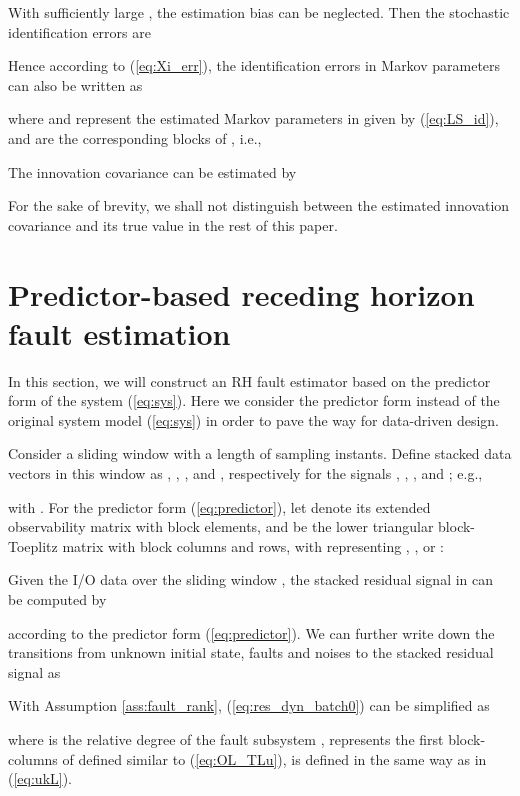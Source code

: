 \documentclass[twocolumn]{autart}
\begin{document}
With sufficiently large , the estimation bias
 can be neglected. Then the stochastic identification errors are

Hence according to (\ref{eq:Xi_err}), the identification errors in Markov parameters can also be written as

where  and  represent the estimated Markov parameters in  given by (\ref{eq:LS_id}),  and  are the corresponding blocks of , i.e.,



The innovation covariance can be estimated by \cite{Gust2001, Kata2005}

For the sake of brevity, we shall not distinguish between the estimated innovation covariance  and its true value  in the rest of this paper.

\section{Predictor-based receding horizon fault estimation}\label{sect:RHFE_predictor}
In this section, we will construct an RH fault estimator based on the predictor form of the system (\ref{eq:sys}). Here we consider the predictor form instead of the original system model (\ref{eq:sys}) in order to pave the way for data-driven design. 



Consider a sliding window with a length of  sampling instants. Define stacked data vectors in this window as , , , and , respectively for the signals , , , and ; e.g.,

with . For the predictor form  (\ref{eq:predictor}), let  denote its extended observability matrix with  block elements, and  be the lower triangular block-Toeplitz matrix with  block columns and rows, with  representing , , or :



Given the I/O data over the sliding window ,
the stacked residual signal  in  can be computed by

according to the predictor form (\ref{eq:predictor}).
We can further write down the transitions from unknown initial state, faults and noises to the stacked residual signal  as

With Assumption \ref{ass:fault_rank}, (\ref{eq:res_dyn_batch0}) can be simplified as

where  is the relative degree of the fault subsystem ,  represents the first  block-columns of  defined similar to (\ref{eq:OL_TLu}),  is defined in the same way as in (\ref{eq:ukL}).
\end{document}
